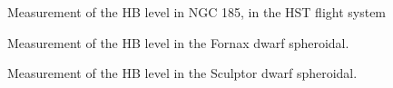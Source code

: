 \documentclass[11pt,preprint2]{aastex}
\begin{document}


%

\begin{figure}
\caption{Measurement of the HB level in NGC 185, in the HST flight system \label{ngc185_hb}}
\end{figure}

\begin{figure}
\caption{Measurement of the HB level in the Fornax dwarf spheroidal. \label{fornax_hb}}
\end{figure}

\begin{figure}
\caption{Measurement of the HB level in the Sculptor dwarf spheroidal. \label{sculptor_hb}}
\end{figure}
%





\end{document}
